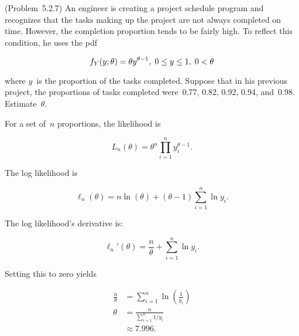 \begin{problem}
  (\textnormal{Problem~5.2.7}) An engineer is creating a project schedule program and recognizes that the tasks making up the project are not always completed on time.  However, the completion proportion tends to be fairly high.  To reflect this condition, he uses the pdf

  \begin{equation}\label{eq:P04}
    f_{Y}(y;\theta)=\theta y^{\theta - 1}, \hspace{0.1cm} 0 \leq y \leq 1, \hspace{0.1cm} 0 < \theta
  \end{equation}

  \noindent
  where $y$~is the proportion of the tasks completed.  Suppose that in his previous project, the proportions of tasks completed were~0.77, 0.82, 0.92, 0.94, and~0.98.  Estimate~$\theta$.
\end{problem}

For a set of~$n$ proportions, the likelihood is

\begin{equation}\label{eq:P04:Likelihood}
  L_{n}(\theta) = \theta^{n} \prod_{i=1}^{n} y_{i}^{\theta - 1} \text{.}
\end{equation}

\noindent
The log likelihood is

\begin{equation}\label{eq:P04:LogLikelihood}
  \ell_{n}(\theta) = n\ln(\theta) + (\theta - 1) \sum_{i=1}^{n} \ln y_i \text{.}
\end{equation}

\noindent
The log likelihood's derivative is:

\begin{equation}\label{eq:P04:LogLikelihood:Deriv}
  \ell_{n}'(\theta) = \frac{n}{\theta} + \sum_{i=1}^{n} \ln y_i \text{.}
\end{equation}

\noindent
Setting this to zero yields

\begin{align}
  \frac{n}{\theta} &= \sum_{i=1}^{n} \ln\left(\frac{1}{y_i} \right) \\
  \theta &= \frac{n}{\sum_{i=1}^{n} 1 / y_i} \\
         &\approx \boxed{7.996} \text{.}
\end{align}
